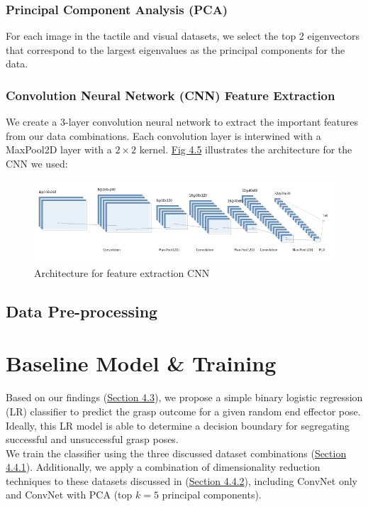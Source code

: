 \documentclass[11pt, a4paper]{report}
\theoremstyle{definition}
\begin{document}
\subsubsection{Principal Component Analysis (PCA)}
\label{sec:4.4.2.1}
For each image in the tactile and visual datasets, we select the top 2 eigenvectors that correspond to the largest eigenvalues as the principal components for the data.


\subsubsection{Convolution Neural Network (CNN) Feature Extraction}
\label{sec:4.4.2.2}
We create a 3-layer convolution neural network to extract the important features from our data combinations. Each convolution layer is interwined with a MaxPool2D layer with a $2\times2$ kernel. \hyperref[fig:4.5]{Fig 4.5} illustrates the architecture for the CNN we used:
\begin{figure}[H]
    \includegraphics[scale=0.7]{docs/Project Report/Media/nn.png}
    \caption{Architecture for feature extraction CNN}
    \label{fig:4.5}
\end{figure}


\subsection{Data Pre-processing}
\label{sec:4.4.3}



\section{Baseline Model \& Training}
\label{sec:4.5}
Based on our findings (\hyperref[sec:4.3]{Section 4.3}), we propose a simple binary logistic regression (LR) classifier to predict the grasp outcome for a given random end effector pose. Ideally, this LR model is able to determine a decision boundary for segregating successful and unsuccessful grasp poses.\\

We train the classifier using the three discussed dataset combinations (\hyperref[sec:4.4.1]{Section 4.4.1}). Additionally, we apply a combination of dimensionality reduction techniques to these datasets discussed in (\hyperref[sec:4.4.2]{Section 4.4.2}), including ConvNet only and ConvNet with PCA (top $k=5$ principal components).
\end{document}
